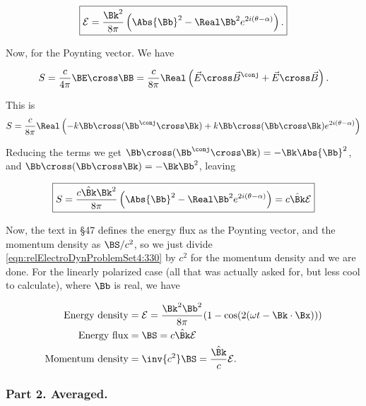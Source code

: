 \begin{equation}\label{eqn:relElectroDynProblemSet4:290}
\boxed{
\mathcal{E} 
=
\frac{ \Bk^2 }{8\pi}
\left(
\Abs{\Bb}^2 
-\Real \Bb^2 e^{2 i(\theta - \alpha)} 
\right).
}
\end{equation}

Now, for the Poynting vector.  We have

\begin{equation}\label{eqn:relElectroDynProblemSet4:310}
S = \frac{c}{4 \pi} \BE \cross \BB = \frac{c}{8 \pi} \Real \left( \vec{E} \cross \vec{B}^\conj + \vec{E} \cross \vec{B} \right).
\end{equation}

This is
\begin{align*}
S 
&= \frac{c}{8 \pi} \Real \left( -k \Bb \cross (\Bb^\conj \cross \Bk) + k \Bb \cross (\Bb \cross \Bk ) e^{2 i(\theta - \alpha)} \right) \\
\end{align*}

Reducing the terms we get $\Bb \cross (\Bb^\conj \cross \Bk) = -\Bk \Abs{\Bb}^2$, and $\Bb \cross (\Bb \cross \Bk) = -\Bk \Bb^2$, leaving

\begin{equation}\label{eqn:relElectroDynProblemSet4:330}
\boxed{
S 
= \frac{c \hat{\Bk} \Bk^2 }{8 \pi} \left( \Abs{\Bb}^2 - \Real \Bb^2 e^{2 i(\theta - \alpha)} \right) = c \hat{\Bk} \mathcal{E}
}
\end{equation}

Now, the text in \S 47 defines the energy flux as the Poynting vector, and the momentum density as $\BS/c^2$, so we just divide \ref{eqn:relElectroDynProblemSet4:330} by $c^2$ for the momentum density and we are done.  For the linearly polarized case (all that was actually asked for, but less cool to calculate), where $\Bb$ is real, we have

\begin{align}\label{eqn:relElectroDynProblemSet4:350}
\mbox{Energy density} &= \mathcal{E} = \frac{ \Bk^2 \Bb^2 }{8\pi} ( 1 - \cos( 2 (\omega t - \Bk \cdot \Bx)) ) \\
\mbox{Energy flux} &= \BS = c \hat{\Bk} \mathcal{E} \\
\mbox{Momentum density} &= \inv{c^2} \BS = \frac{\hat{\Bk}}{c} \mathcal{E}.
\end{align}

\subsubsection{Part 2.  Averaged.}

